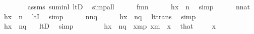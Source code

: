 \begin{isabellebody}
\ \ \ \ \ \ \isamarkupfalse%
\ assms\ sum{\isacharunderscore}{\kern0pt}inl\ ltD\ \isamarkupfalse%
\ simp{\isacharunderscore}{\kern0pt}all\isanewline
\ \ \ \ \isamarkupfalse%
\ {\isacartoucheopen}f{\isasymin}m{\isasymrightarrow}n{\isacartoucheclose}\isanewline
\ \ \ \ \isamarkupfalse%
\ {\isachardoublequoteopen}{\isacharquery}{\kern0pt}h{\isacharbackquote}{\kern0pt}x\ {\isasymin}\ n{\isachardoublequoteclose}\ \isamarkupfalse%
\ simp\isanewline
\ \ \ \ \isamarkupfalse%
\ {\isacartoucheopen}n{\isasymin}nat{\isacartoucheclose}\ \isamarkupfalse%
\ {\isachardoublequoteopen}{\isacharquery}{\kern0pt}h{\isacharbackquote}{\kern0pt}x\ {\isacharless}{\kern0pt}\ n{\isachardoublequoteclose}\ \isamarkupfalse%
\ ltI\ \isamarkupfalse%
\ simp\isanewline
\ \ \ \ \isamarkupfalse%
\ {\isacartoucheopen}n{\isasymle}n{\isacharhash}{\kern0pt}{\isacharplus}{\kern0pt}q{\isacartoucheclose}\isanewline
\ \ \ \ \isamarkupfalse%
\ {\isachardoublequoteopen}{\isacharquery}{\kern0pt}h{\isacharbackquote}{\kern0pt}x\ {\isacharless}{\kern0pt}\ n{\isacharhash}{\kern0pt}{\isacharplus}{\kern0pt}q{\isachardoublequoteclose}\ \isamarkupfalse%
\ lt{\isacharunderscore}{\kern0pt}trans{}\ \isamarkupfalse%
\ simp\isanewline
\ \ \ \ \isamarkupfalse%
\isanewline
\ \ \ \ \isamarkupfalse%
\ {\isachardoublequoteopen}{\isacharquery}{\kern0pt}h{\isacharbackquote}{\kern0pt}x\ {\isasymin}\ n{\isacharhash}{\kern0pt}{\isacharplus}{\kern0pt}q{\isachardoublequoteclose}\ \ \isamarkupfalse%
\ ltD\ \isamarkupfalse%
\ simp\isanewline
\ \ \isacommand{{\isacharbraceright}{\kern0pt}}\isamarkupfalse%
\isanewline
\ \ \isamarkupfalse%
\ \isamarkupfalse%
\ {}{\isacharcolon}{\kern0pt}{\isachardoublequoteopen}{\isacharquery}{\kern0pt}h{\isacharbackquote}{\kern0pt}x\ {\isasymin}\ n{\isacharhash}{\kern0pt}{\isacharplus}{\kern0pt}q{\isachardoublequoteclose}\ \ {\isachardoublequoteopen}x{\isasymin}m{\isacharhash}{\kern0pt}{\isacharplus}{\kern0pt}p{\isachardoublequoteclose}\ {\isachardoublequoteopen}x{\isacharless}{\kern0pt}m{\isachardoublequoteclose}\ \ x\ \isamarkupfalse%
\ that\ \isacommand{{\isachardot}{\kern0pt}}\isamarkupfalse%
\isanewline
\ \ \isacommand{{\isacharbraceleft}{\kern0pt}}\isamarkupfalse%
\isamarkupfalse%
\ x\isanewline

\end{isabellebody}
